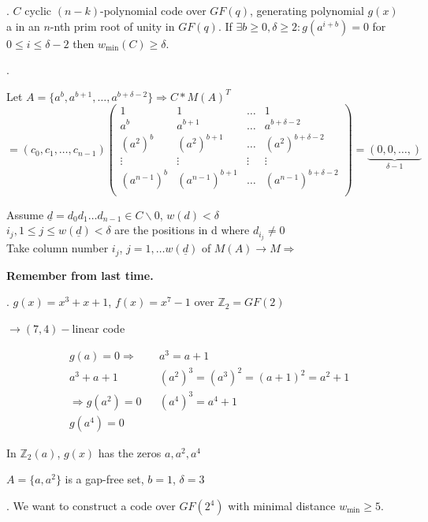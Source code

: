 \Theorem.
$C$ cyclic $(n-k)$-polynomial code over $GF(q)$, generating polynomial $g(x)$ a in an $n$-nth prim root of unity in $GF(q)$. If $\exists b \geq 0, \delta \geq 2: g(a^{i+b}) = 0$ for $0 \leq i \leq \delta -2$ then $w_{\min}(C) \geq \delta$.

\Proof.

Let $A = \{a^b , a^{b+1}, \ldots, a^{b+\delta-2}\} \Rightarrow C * M(A)^T$\\
$= (c_0, c_1, \ldots, c_{n-1}) \begin{pmatrix}
  1 & 1& \ldots & 1\\
  a^{b} & a^{b+1} & \ldots & a^{b+\delta-2} \\
  (a^{2})^{b} & (a^{2})^{b+1} & \ldots & (a^{2})^{b+\delta-2} \\
  \vdots  & \vdots & \vdots & \vdots \\
  (a^{n-1})^{b} & (a^{n-1})^{b+1} & \ldots & (a^{n-1})^{b+\delta-2} \\
\end{pmatrix} = \underbrace{(0,0,\ldots, )}_{\delta-1}$

Assume $\underline{d} = d_0 d_1 \ldots d_{n-1} \in C \backslash{0}$, $w(d) < \delta$\\
$i_j, 1 \leq j \leq w(\underline{d}) < \delta$ are the positions in d where $d_{i_j} \neq 0$ \\
Take column number $i_j$, $j= 1, \ldots w(\underline{d})$ of $M(A) \to M \Rightarrow$


\textbf{Remember from last time.}

\Example.
$g(x) = x^3 +x+1$, $f(x) = x^7-1$ over $\mathbb{Z}_2 = GF(2)$

$\to (7,4)-$linear code

\begin{align*}
  &g(a) = 0 \Rightarrow && a^3= a+1\\
  &a^3+a+1              &&(a^2)^3 = (a^3)^2 = (a+1)^2 = a^2+1\\
  &\Rightarrow g(a^2) = 0  && (a^4)^3 = a^4+1\\
  &g(a^4)=0
\end{align*}

In $\mathbb{Z}_2(a)$, $g(x)$ has the zeros $a,a^2,a^4$

$A = \{a,a^2\}$ is a gap-free set, $b=1$, $\delta =3$

\Example.
We want to construct a code over $GF(2^4)$ with minimal distance $w_{\min} \geq 5$.

